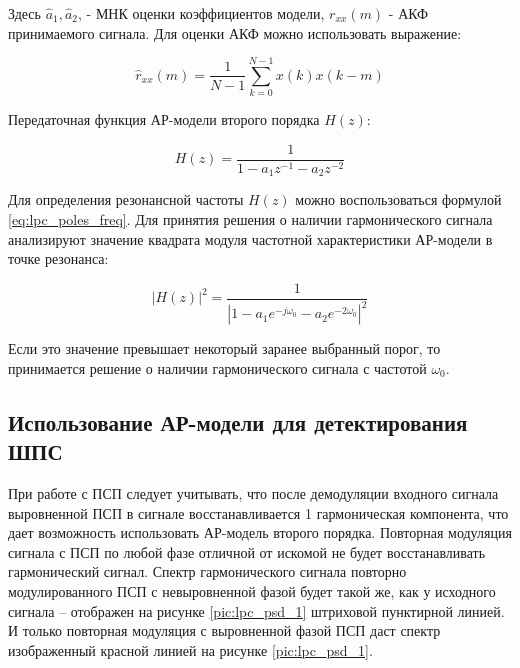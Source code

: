 Здесь ${\hat{a}_1, \hat{a}_2}$, - МНК оценки коэффициентов модели, ${r_{xx}(m)}$ - АКФ принимаемого сигнала.
Для оценки АКФ  можно использовать выражение:

\begin{center}
\begin{equation}
	\label{eq:lpc_rxx_estimation}
	\hat{r}_{xx}(m) = \frac{1}{N-1} \sum \limits_{k=0}^{N-1} x(k)x(k-m)
\end{equation}
\end{center}

Передаточная функция АР-модели второго порядка ${H(z)}$:
\begin{center}
\begin{equation}
	\label{eq:lpc_spectral_func}
	H(z) = \frac{1}{1 - a_1 z^{-1} - a_2 z^{-2}}
\end{equation}
\end{center}

Для определения резонансной частоты ${H(z)}$ можно воспользоваться формулой \ref{eq:lpc_poles_freq}.
Для принятия решения о наличии гармонического сигнала анализируют значение квадрата модуля частотной
характеристики АР-модели в точке резонанса:

\begin{center}
\begin{equation}
	\label{eq:lpc_power_cos}
	\left| H(z) \right|^2 = \frac{1}{\left| 1 - a_1 e^{-j \omega_0} - a_2 e^{-2 \omega_0} \right|^2}
\end{equation}
\end{center}

Если это значение превышает некоторый заранее выбранный порог, то принимается решение о наличии гармонического
сигнала с частотой ${\omega_0}$. 

\subsection{Использование АР-модели для детектирования ШПС}
\label{ssec4:lpc_cdma_detect}

При работе с ПСП следует учитывать, что после демодуляции входного сигнала выровненной ПСП в сигнале восстанавливается 1 гармоническая
компонента, что дает возможность использовать АР-модель второго порядка.
Повторная модуляция сигнала с ПСП по любой фазе отличной от искомой не будет восстанавливать гармонический сигнал.
Спектр гармонического сигнала повторно модулированного ПСП с невыровненной фазой будет такой же, как у исходного сигнала – отображен
на рисунке \ref{pic:lpc_psd_1} штриховой пунктирной линией. И только повторная модуляция с выровненной фазой ПСП даст спектр
изображенный красной линией на рисунке \ref{pic:lpc_psd_1}.

